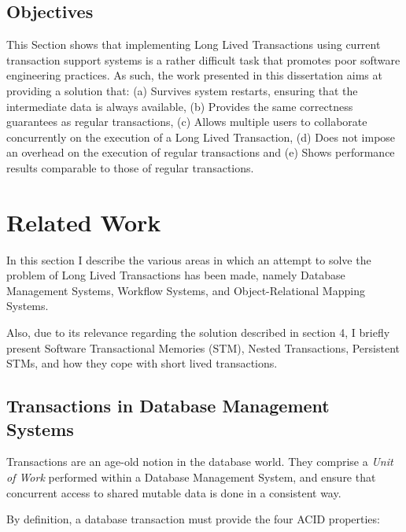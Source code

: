 \documentclass{llncs}
\begin{document}
\subsection{Objectives}

This Section shows that implementing Long Lived Transactions using
current transaction support systems is a rather difficult task that
promotes poor software engineering practices. As such, the work
presented in this dissertation aims at providing a solution that: (a)
Survives system restarts, ensuring that the intermediate data is
always available, (b) Provides the same correctness guarantees as
regular transactions, (c) Allows multiple users to collaborate
concurrently on the execution of a Long Lived Transaction, (d) Does
not impose an overhead on the execution of regular transactions and
(e) Shows performance results comparable to those of regular
transactions.



\section{Related Work}
\label{chap:related}

In this section I describe the various areas in which an attempt to
solve the problem of Long Lived Transactions has been made, namely
Database Management Systems, Workflow Systems, and Object-Relational
Mapping Systems.

Also, due to its relevance regarding the solution described in section
4, I briefly present Software Transactional Memories (STM), Nested
Transactions, Persistent STMs, and how they cope with short lived
transactions.

\subsection{Transactions in Database Management Systems}
\label{sec:rdbms}

Transactions are an age-old notion in the database world. They
comprise a {\it Unit of Work} performed within a Database Management
System, and ensure that concurrent access to shared mutable data is
done in a consistent way.

By definition, a database transaction must provide the four ACID
properties:
\end{document}
